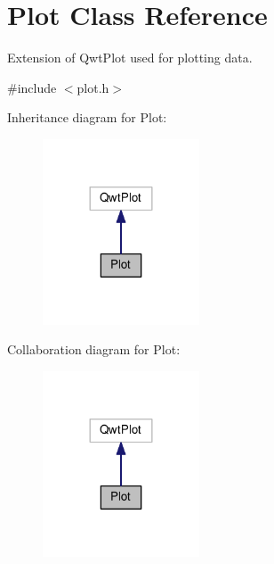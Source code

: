 \hypertarget{classPlot}{}\section{Plot Class Reference}
\label{classPlot}


Extension of Qwt\+Plot used for plotting data.  




{\ttfamily \#include $<$plot.\+h$>$}



Inheritance diagram for Plot\+:
\nopagebreak
\begin{figure}[H]
\begin{center}
\leavevmode
\includegraphics[width=132pt]{classPlot__inherit__graph}
\end{center}
\end{figure}


Collaboration diagram for Plot\+:
\nopagebreak
\begin{figure}[H]
\begin{center}
\leavevmode
\includegraphics[width=132pt]{classPlot__coll__graph}
\end{center}
\end{figure}
